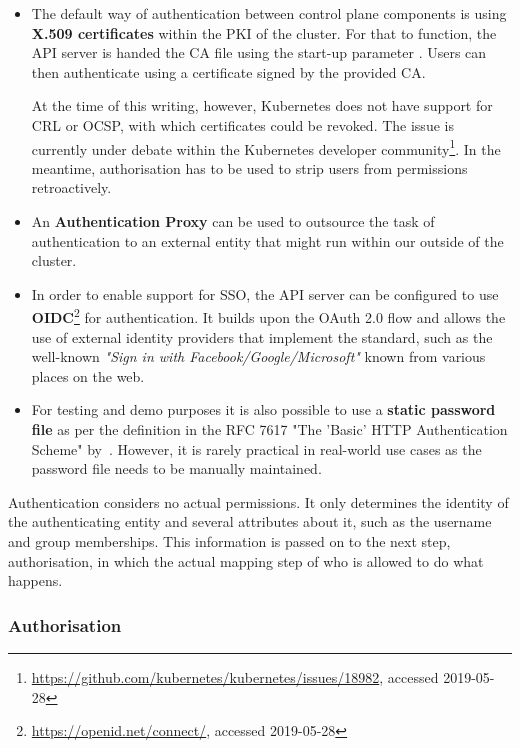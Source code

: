 \begin{itemize}
    \item The default way of authentication between control plane components is using \textbf{X.509 certificates} within the \ac{PKI} of the cluster. For that to function, the API server is handed the \ac{CA} file using the start-up parameter . Users can then authenticate using a certificate signed by the provided CA. 
    
    At the time of this writing, however, Kubernetes does not have support for \ac{CRL} or \ac{OCSP}, with which certificates could be revoked. The issue is currently under debate within the Kubernetes developer community\footnote{\url{https://github.com/kubernetes/kubernetes/issues/18982}, accessed 2019-05-28}. In the meantime, authorisation has to be used to strip users from permissions retroactively.

    \item An \textbf{Authentication Proxy} can be used to outsource the task of authentication to an external entity that might run within our outside of the cluster.
    
    \item In order to enable support for \ac{SSO}, the API server can be configured to use \textbf{\ac{OIDC}}\footnote{\url{https://openid.net/connect/}, accessed 2019-05-28} for authentication. It builds upon the OAuth 2.0 flow and allows the use of external identity providers that implement the standard, such as the well-known \textit{"Sign in with Facebook/Google/Microsoft"} known from various places on the web. 

   \item For testing and demo purposes it is also possible to use a \textbf{static password file} as per the definition in the RFC 7617 "The 'Basic' HTTP Authentication Scheme" by~\textcite{RFC7617}. However, it is rarely practical in real-world use cases as the password file needs to be manually maintained.
	
\end{itemize}

Authentication considers no actual permissions. It only determines the identity of the authenticating entity and several attributes about it, such as the username and group memberships. This information is passed on to the next step, authorisation, in which the actual mapping step of who is allowed to do what happens. 

\subsubsection{Authorisation} \label{ssec:authorisation}

